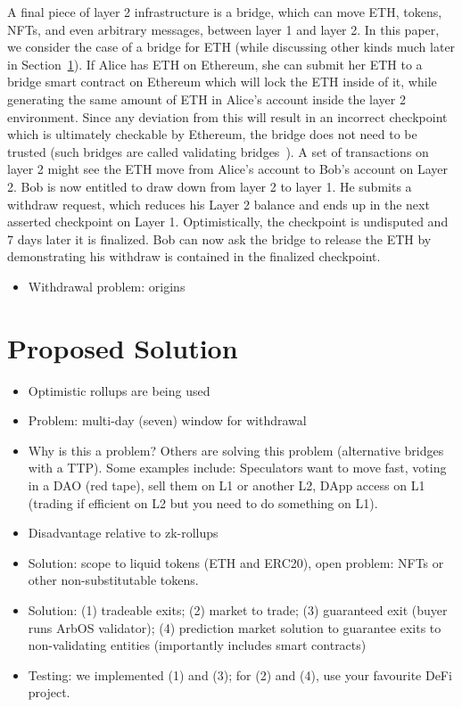 A final piece of layer 2 infrastructure is a bridge, which can move ETH, tokens, NFTs, and even arbitrary messages, between layer 1 and layer 2. In this paper, we consider the case of a bridge for ETH (while discussing other kinds much later in Section~\ref{}). If Alice has ETH on Ethereum, she can submit her ETH to a bridge smart contract on Ethereum which will lock the ETH inside of it, while generating the same amount of ETH in Alice's account inside the layer 2 environment. Since any deviation from this will result in  an incorrect checkpoint which is ultimately checkable by Ethereum, the bridge does not need to be trusted (such bridges are called validating bridges~\cite{}). A set of transactions on layer 2 might see the ETH move from Alice's account to Bob's account on Layer 2. Bob is now entitled to draw down from layer 2 to layer 1. He submits a withdraw request, which reduces his Layer 2 balance and ends up in the next asserted checkpoint on Layer 1. Optimistically, the checkpoint is undisputed and 7 days later it is finalized. Bob can now ask the bridge to release the ETH by demonstrating his withdraw is contained in the finalized checkpoint. 


\begin{itemize}
\item Withdrawal problem: origins
\end{itemize}


\section{Proposed Solution} 



\begin{itemize}
\item Optimistic rollups are being used
\item Problem: multi-day (\eg seven) window for withdrawal
\item Why is this a problem? Others are solving this problem (alternative bridges with a TTP). Some examples include: Speculators want to move fast, voting in a DAO (red tape), sell them on L1 or another L2, DApp access on L1 (trading if efficient on L2 but you need to do something on L1). 
\item Disadvantage relative to zk-rollups
\item Solution: scope to liquid tokens (ETH and ERC20), open problem: NFTs or other non-substitutable tokens. 
\item Solution: (1) tradeable exits; (2) market to trade; (3) guaranteed exit (buyer runs ArbOS validator); (4) prediction market solution to guarantee exits to non-validating entities (importantly includes smart contracts)
\item Testing: we implemented (1) and (3); for (2) and (4), use your favourite DeFi project.
\end{itemize}


